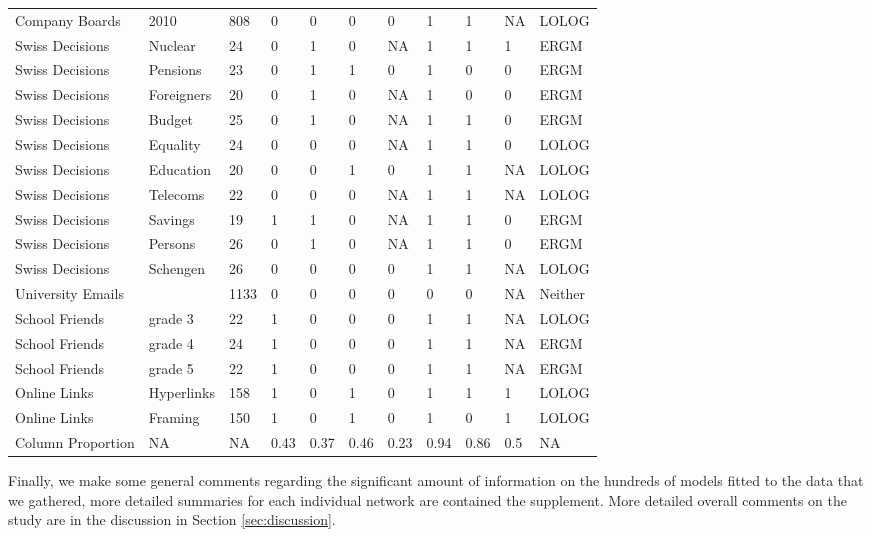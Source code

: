 \documentclass[
]{statsoc}
\begin{document}
\begin{table}
\begin{tabular}[t]{lllllllllll}
Company Boards & 2010 & 808 & 0 & 0 & 0 & 0 & 1 & 1 & NA & LOLOG\\
\addlinespace
\rowcolor{gray!6}  Swiss Decisions & Nuclear & 24 & 0 & 1 & 0 & NA & 1 & 1 & 1 & ERGM\\
Swiss Decisions & Pensions & 23 & 0 & 1 & 1 & 0 & 1 & 0 & 0 & ERGM\\
\rowcolor{gray!6}  Swiss Decisions & Foreigners & 20 & 0 & 1 & 0 & NA & 1 & 0 & 0 & ERGM\\
Swiss Decisions & Budget & 25 & 0 & 1 & 0 & NA & 1 & 1 & 0 & ERGM\\
\rowcolor{gray!6}  Swiss Decisions & Equality & 24 & 0 & 0 & 0 & NA & 1 & 1 & 0 & LOLOG\\
\addlinespace
Swiss Decisions & Education & 20 & 0 & 0 & 1 & 0 & 1 & 1 & NA & LOLOG\\
\rowcolor{gray!6}  Swiss Decisions & Telecoms & 22 & 0 & 0 & 0 & NA & 1 & 1 & NA & LOLOG\\
Swiss Decisions & Savings & 19 & 1 & 1 & 0 & NA & 1 & 1 & 0 & ERGM\\
\rowcolor{gray!6}  Swiss Decisions & Persons & 26 & 0 & 1 & 0 & NA & 1 & 1 & 0 & ERGM\\
Swiss Decisions & Schengen & 26 & 0 & 0 & 0 & 0 & 1 & 1 & NA & LOLOG\\
\addlinespace
\rowcolor{gray!6}  University Emails &  & 1133 & 0 & 0 & 0 & 0 & 0 & 0 & NA & Neither\\
School Friends & grade 3 & 22 & 1 & 0 & 0 & 0 & 1 & 1 & NA & LOLOG\\
\rowcolor{gray!6}  School Friends & grade 4 & 24 & 1 & 0 & 0 & 0 & 1 & 1 & NA & ERGM\\
School Friends & grade 5 & 22 & 1 & 0 & 0 & 0 & 1 & 1 & NA & ERGM\\
\rowcolor{gray!6}  Online Links & Hyperlinks & 158 & 1 & 0 & 1 & 0 & 1 & 1 & 1 & LOLOG\\
\addlinespace
Online Links & Framing & 150 & 1 & 0 & 1 & 0 & 1 & 0 & 1 & LOLOG\\
\hline
\hline
\rowcolor{gray!6}  Column Proportion & NA & NA & 0.43 & 0.37 & 0.46 & 0.23 & 0.94 & 0.86 & 0.5 & NA\\
\bottomrule
\end{tabular}
\end{table}

Finally, we make some general comments regarding the significant amount
of information on the hundreds of models fitted to the data that we
gathered, more detailed summaries for each individual network are
contained the supplement. More detailed overall comments on the study
are in the discussion in Section \ref{sec:discussion}.
\end{document}
